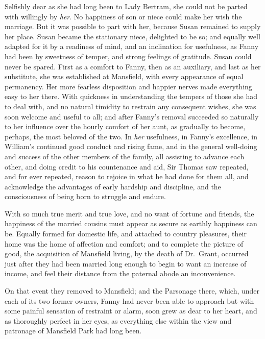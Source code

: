 \documentclass{article}
\begin{document}
Selfishly dear as she had long been to Lady Bertram,
she could not be parted with willingly by \emph{her}.
No happiness of son or niece could make her wish
the marriage.  But it was possible to part with her,
because Susan remained to supply her place.
Susan became the stationary niece, delighted to be so;
and equally well adapted for it by a readiness of mind,
and an inclination for usefulness, as Fanny had been
by sweetness of temper, and strong feelings of gratitude.
Susan could never be spared.  First as a comfort to Fanny,
then as an auxiliary, and last as her substitute,
she was established at Mansfield, with every appearance
of equal permanency.  Her more fearless disposition
and happier nerves made everything easy to her there.
With quickness in understanding the tempers of those she
had to deal with, and no natural timidity to restrain
any consequent wishes, she was soon welcome and useful
to all; and after Fanny's removal succeeded so naturally
to her influence over the hourly comfort of her aunt,
as gradually to become, perhaps, the most beloved of the two.
In \emph{her} usefulness, in Fanny's excellence, in William's
continued good conduct and rising fame, and in the general
well-doing and success of the other members of the family,
all assisting to advance each other, and doing credit
to his countenance and aid, Sir Thomas saw repeated,
and for ever repeated, reason to rejoice in what he had
done for them all, and acknowledge the advantages of early
hardship and discipline, and the consciousness of being born
to struggle and endure.

With so much true merit and true love, and no want of
fortune and friends, the happiness of the married cousins
must appear as secure as earthly happiness can be.
Equally formed for domestic life, and attached to
country pleasures, their home was the home of affection
and comfort; and to complete the picture of good,
the acquisition of Mansfield living, by the death of
Dr.\ Grant, occurred just after they had been married long
enough to begin to want an increase of income, and feel
their distance from the paternal abode an inconvenience.

On that event they removed to Mansfield; and the Parsonage
there, which, under each of its two former owners, Fanny had
never been able to approach but with some painful sensation
of restraint or alarm, soon grew as dear to her heart,
and as thoroughly perfect in her eyes, as everything else
within the view and patronage of Mansfield Park had long been.
\end{document}
